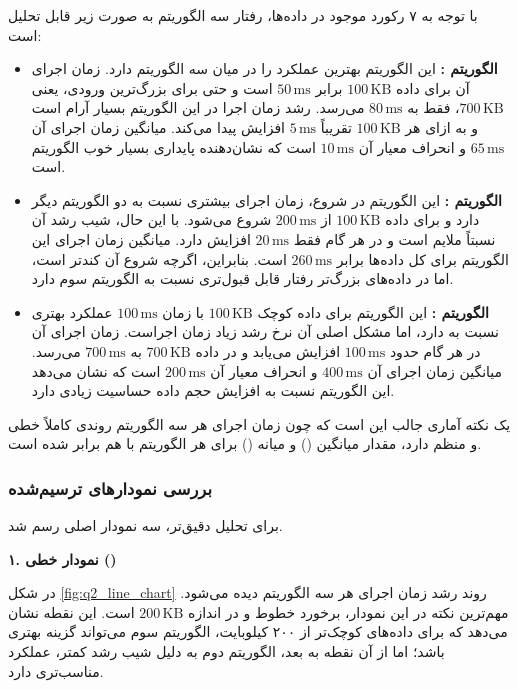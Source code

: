\documentclass[12pt,a4paper]{article}
\begin{document}
	با توجه به ۷ رکورد موجود در داده‌ها، رفتار سه الگوریتم به صورت زیر قابل تحلیل است:
	
	\begin{itemize}
		\item \textbf{الگوریتم :}
		این الگوریتم بهترین عملکرد را در میان سه الگوریتم دارد. زمان اجرای آن برای داده
		$100\,\text{KB}$
		برابر
		$50\,\text{ms}$
		است و حتی برای بزرگ‌ترین ورودی، یعنی
		$700\,\text{KB}$،
		فقط به
		$80\,\text{ms}$
		می‌رسد. رشد زمان اجرا در این الگوریتم بسیار آرام است و به ازای هر
		$100\,\text{KB}$
		تقریباً
		$5\,\text{ms}$
		افزایش پیدا می‌کند. میانگین زمان اجرای آن
		$65\,\text{ms}$
		و انحراف معیار آن
		$10\,\text{ms}$
		است که نشان‌دهنده پایداری بسیار خوب الگوریتم است.
		
		\item \textbf{الگوریتم :}
		این الگوریتم در شروع، زمان اجرای بیشتری نسبت به دو الگوریتم دیگر دارد و برای داده
		$100\,\text{KB}$
		از
		$200\,\text{ms}$
		شروع می‌شود. با این حال، شیب رشد آن نسبتاً ملایم است و در هر گام فقط
		$20\,\text{ms}$
		افزایش دارد. میانگین زمان اجرای این الگوریتم برای کل داده‌ها برابر
		$260\,\text{ms}$
		است. بنابراین، اگرچه شروع آن کندتر است، اما در داده‌های بزرگ‌تر رفتار قابل قبول‌تری نسبت به الگوریتم سوم دارد.
		
		\item \textbf{الگوریتم :}
		این الگوریتم برای داده کوچک
		$100\,\text{KB}$
		با زمان
		$100\,\text{ms}$
		عملکرد بهتری نسبت به
		دارد، اما مشکل اصلی آن نرخ رشد زیاد زمان اجراست. زمان اجرای آن در هر گام حدود
		$100\,\text{ms}$
		افزایش می‌یابد و در داده
		$700\,\text{KB}$
		به
		$700\,\text{ms}$
		می‌رسد. میانگین زمان اجرای آن
		$400\,\text{ms}$
		و انحراف معیار آن
		$200\,\text{ms}$
		است که نشان می‌دهد این الگوریتم نسبت به افزایش حجم داده حساسیت زیادی دارد.
	\end{itemize}
	
	یک نکته آماری جالب این است که چون زمان اجرای هر سه الگوریتم روندی کاملاً خطی و منظم دارد، مقدار میانگین
	()
	و میانه
	()
	برای هر الگوریتم با هم برابر شده است.
	
	\subsubsection*{بررسی نمودارهای ترسیم‌شده}
	
	برای تحلیل دقیق‌تر، سه نمودار اصلی رسم شد.
	
	\textbf{۱. نمودار خطی ()}
	
	در شکل
	\ref{fig:q2_line_chart}
	روند رشد زمان اجرای هر سه الگوریتم دیده می‌شود. مهم‌ترین نکته در این نمودار، برخورد خطوط
	و
	در اندازه
	$200\,\text{KB}$
	است. این نقطه نشان می‌دهد که برای داده‌های کوچک‌تر از ۲۰۰ کیلوبایت، الگوریتم سوم می‌تواند گزینه بهتری باشد؛ اما از آن نقطه به بعد، الگوریتم دوم به دلیل شیب رشد کمتر، عملکرد مناسب‌تری دارد.
	
\end{document}
